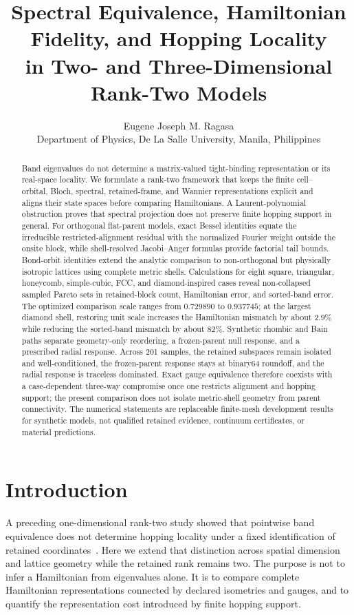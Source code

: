 \documentclass[11pt]{article}
\title{\textbf{Spectral Equivalence, Hamiltonian Fidelity, and Hopping Locality\\
in Two- and Three-Dimensional Rank-Two Models}}
\author{Eugene Joseph M. Ragasa\\
Department of Physics, De La Salle University, Manila, Philippines}
\date{}
\begin{document}
\maketitle

\begin{abstract}
Band eigenvalues do not determine a matrix-valued tight-binding representation or its
real-space locality. We formulate a rank-two framework that keeps the finite
cell--orbital, Bloch, spectral, retained-frame, and Wannier representations explicit and
aligns their state spaces before comparing Hamiltonians. A Laurent-polynomial
obstruction proves that spectral projection does not preserve finite hopping support in
general. For orthogonal flat-parent models, exact Bessel identities equate the
irreducible restricted-alignment residual with the normalized Fourier weight outside the
onsite block, while shell-resolved Jacobi--Anger formulas provide factorial tail bounds.
Bond-orbit identities extend the analytic comparison to non-orthogonal but physically
isotropic lattices using complete metric shells. Calculations for eight square,
triangular, honeycomb, simple-cubic, FCC, and diamond-inspired cases reveal non-collapsed
sampled Pareto sets in retained-block count, Hamiltonian error, and sorted-band error.
The optimized comparison scale ranges from $0.729890$ to $0.937745$; at the largest
diamond shell, restoring unit scale increases the Hamiltonian mismatch by about $2.9\%$
while reducing the sorted-band mismatch by about $82\%$. Synthetic rhombic and Bain
paths separate geometry-only reordering, a frozen-parent null response, and a prescribed
radial response. Across 201 samples, the retained subspaces remain isolated and
well-conditioned, the frozen-parent response stays at binary64 roundoff, and the radial
response is traceless dominated. Exact gauge equivalence therefore coexists with a
case-dependent three-way compromise once one restricts alignment and hopping support;
the present comparison does not isolate metric-shell geometry from parent connectivity.
The numerical statements are replaceable finite-mesh development results for synthetic
models, not qualified retained evidence, continuum certificates, or material predictions.
\end{abstract}

\section{Introduction}

A preceding one-dimensional rank-two study showed that pointwise band equivalence does
not determine hopping locality under a fixed identification of retained
coordinates~\cite{Ragasa2026a}. Here we extend that distinction across spatial dimension
and lattice geometry while the retained rank remains two. The purpose is not
to infer a Hamiltonian from eigenvalues alone. It is to compare
complete Hamiltonian representations connected by declared isometries and gauges, and
to quantify the representation cost introduced by finite hopping support.
\end{document}
